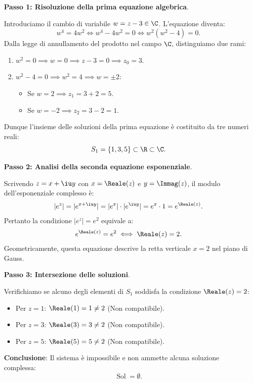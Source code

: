 \begin{dimostrazione}
\textbf{Passo 1: Risoluzione della prima equazione algebrica}.

Introduciamo il cambio di variabile $w = z - 3 \in \C$. L'equazione diventa:
\begin{equation}
    w^4 = 4 w^2 \iff w^4 - 4w^2 = 0 \iff w^2(w^2 - 4) = 0.
\end{equation}
Dalla legge di annullamento del prodotto nel campo $\C$, distinguiamo due rami:
\begin{enumerate}
    \item $w^2 = 0 \implies w = 0 \implies z - 3 = 0 \implies z_0 = 3$.
    \item $w^2 - 4 = 0 \implies w^2 = 4 \implies w = \pm 2$:
    \begin{itemize}
        \item Se $w = 2 \implies z_1 = 3 + 2 = 5$.
        \item Se $w = -2 \implies z_2 = 3 - 2 = 1$.
    \end{itemize}
\end{enumerate}
Dunque l'insieme delle soluzioni della prima equazione è costituito da tre numeri reali:
\begin{equation}
    S_1 = \{1, 3, 5\} \subset \R \subset \C.
\end{equation}

\textbf{Passo 2: Analisi della seconda equazione esponenziale}.

Scrivendo $z = x + \iu y$ con $x = \Reale(z)$ e $y = \Immag(z)$, il modulo dell'esponenziale complesso è:
\begin{equation}
    |e^z| = |e^{x + \iu y}| = |e^x| \cdot |e^{\iu y}| = e^x \cdot 1 = e^{\Reale(z)}.
\end{equation}
Pertanto la condizione $|e^z| = e^2$ equivale a:
\begin{equation}
    e^{\Reale(z)} = e^2 \iff \Reale(z) = 2.
\end{equation}
Geometricamente, questa equazione descrive la retta verticale $x = 2$ nel piano di Gauss.

\textbf{Passo 3: Intersezione delle soluzioni}.

Verifichiamo se alcuno degli elementi di $S_1$ soddisfa la condizione $\Reale(z) = 2$:
\begin{itemize}
    \item Per $z = 1$: $\Reale(1) = 1 \neq 2$ (Non compatibile).
    \item Per $z = 3$: $\Reale(3) = 3 \neq 2$ (Non compatibile).
    \item Per $z = 5$: $\Reale(5) = 5 \neq 2$ (Non compatibile).
\end{itemize}

\textbf{Conclusione}: Il sistema è impossibile e non ammette alcuna soluzione complessa:
\begin{equation}
    \operatorname{Sol} = \emptyset.
\end{equation}
\end{dimostrazione}

